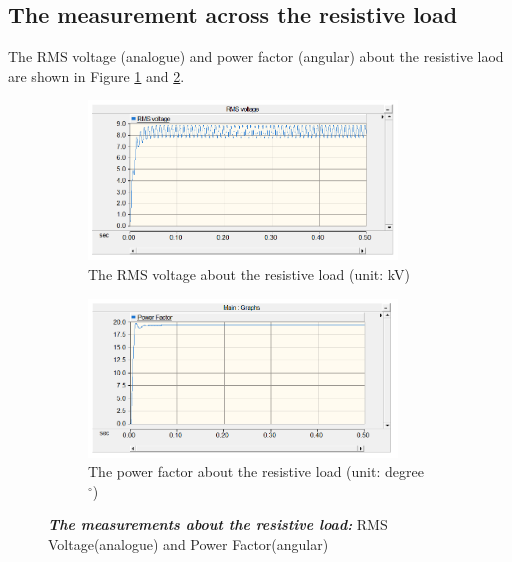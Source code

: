 \documentclass[12pt]{report} %
\begin{document}
\subsection{The measurement across the resistive load}
The RMS voltage (analogue) and power factor (angular) about the resistive laod are shown in Figure \ref{fig:Q2R_RMS} and \ref{fig:Q2R_PF}. 
\begin{figure}[H]
    \centering %
    \begin{subfigure}[b]{\textwidth}
        \centering
        \includegraphics[width=0.9\textwidth]{Image/Q2/Q2_resistor_RMS.PNG}
        \caption{The RMS voltage about the resistive load (unit: kV)}
        \label{fig:Q2R_RMS}
    \end{subfigure}
    \hfill
    \centering %
    \begin{subfigure}[b]{\textwidth}
        \centering
        \includegraphics[width=0.9\textwidth]{Image/Q2/Q2_resistor_PF.PNG}
        \caption{The power factor about the resistive load (unit: degree~$^\circ$)}
        \label{fig:Q2R_PF}
    \end{subfigure} 
    \caption[The RMS voltage and power factor about the resistive load ]
    {\centering \textit{\textbf{The measurements about the resistive load:}} RMS Voltage(analogue) and Power Factor(angular)}
    \label{fig:Q2R}
\end{figure}
\newpage
\end{document}
